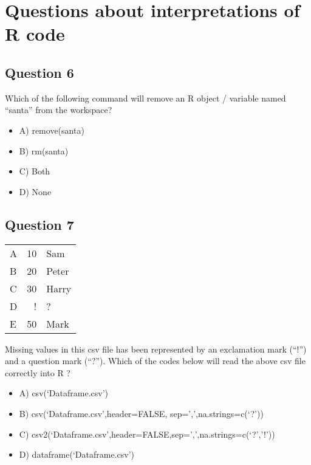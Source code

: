 \documentclass[11pt]{article}
\begin{document}
\section*{Questions about interpretations of R code}
\label{sec:orgd496495}
\subsection*{Question 6}
\label{sec:orgcf25e65}
Which of the following command will remove an R object / variable named “santa” from the workspace?

\begin{itemize}
\item A) remove(santa)

\item B) rm(santa)

\item C) Both

\item D) None
\end{itemize}

\subsection*{Question 7}
\label{sec:orgecd2662}

\begin{center}
\begin{tabular}{lrl}
A & 10 & Sam\\
B & 20 & Peter\\
C & 30 & Harry\\
D & ! & ?\\
E & 50 & Mark\\
\end{tabular}
\end{center}

Missing values in this csv file has been represented by an exclamation mark
(“!”) and a question mark (“?”). Which of the codes below will read the above
csv file correctly into R ?

\begin{itemize}
\item A) csv(‘Dataframe.csv’)

\item B) csv(‘Dataframe.csv’,header=FALSE, sep=’,’,na.strings=c(‘?’))

\item C) csv2(‘Dataframe.csv’,header=FALSE,sep=’,’,na.strings=c(‘?’,’!’))

\item D) dataframe(‘Dataframe.csv’)
\end{itemize}
\end{document}
